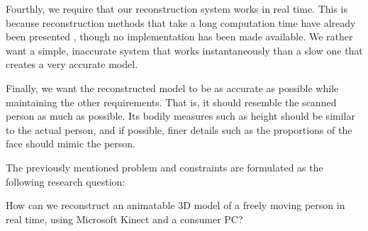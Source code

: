 Fourthly, we require that our reconstruction system works in real time. This is because reconstruction methods that take a long computation time have already been presented \citep{weiss2011home}, though no implementation has been made available. We rather want a simple, inaccurate system that works instantaneously than a slow one that creates a very accurate model.

Finally, we want the reconstructed model to be as accurate as possible while maintaining the other requirements. That is, it should resemble the scanned person as much as possible. Its bodily measures such as height should be similar to the actual person, and if possible, finer details such as the proportions of the face should mimic the person.

The previously mentioned problem and constraints are formulated as the following research question:

How can we reconstruct an animatable 3D model of a freely moving person in real time, using Microsoft Kinect and a consumer PC?

